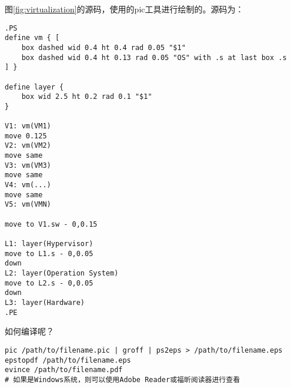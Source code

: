 图\ref{fig:virtualization}的源码，使用的pic工具进行绘制的。源码为：

\begin{verbatim}
.PS
define vm { [
    box dashed wid 0.4 ht 0.4 rad 0.05 "$1"
    box dashed wid 0.4 ht 0.13 rad 0.05 "OS" with .s at last box .s
] }

define layer {
    box wid 2.5 ht 0.2 rad 0.1 "$1"
}

V1: vm(VM1)
move 0.125
V2: vm(VM2)
move same
V3: vm(VM3)
move same
V4: vm(...)
move same
V5: vm(VMN)

move to V1.sw - 0,0.15

L1: layer(Hypervisor)
move to L1.s - 0,0.05
down
L2: layer(Operation System)
move to L2.s - 0,0.05
down
L3: layer(Hardware)
.PE
\end{verbatim}

如何编译呢？

\begin{verbatim}
pic /path/to/filename.pic | groff | ps2eps > /path/to/filename.eps
epstopdf /path/to/filename.eps
evince /path/to/filename.pdf
# 如果是Windows系统，则可以使用Adobe Reader或福昕阅读器进行查看
\end{verbatim}